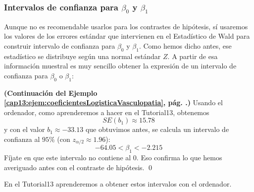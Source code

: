 \subsubsection{Intervalos de confianza para $\beta_0$ y $\beta_1$}

Aunque no es recomendable usarlos para los contrastes de hipótesis, sí usaremos los valores de los errores estándar que intervienen en el Estadístico de Wald para construir intervalo de confianza para $\beta_0$ y $\beta_1$.  Como hemos dicho antes, ese estadístico se distribuye según una normal estándar $Z$. A partir de esa información muestral es muy sencillo obtener la expresión de un intervalo de confianza para $\beta_0$ o $\beta_1$:


\begin{center}
	\end{center}
	
\begin{ejemplo}
\label{cap13:ejem:intConfCoeficientesGlmVasculopatia}
{\bf (Continuación del Ejemplo \ref{cap13:ejem:coeficientesLogisticaVasculopatia}, pág. \pageref{cap13:ejem:coeficientesLogisticaVasculopatia}.)}
Usando el ordenador, como aprenderemos a hacer en el Tutorial13, obtenemos
\[SE(b_1) \approx 15.78 \]
y con el valor $b_1\approx -33.13$ que obtuvimos antes, se calcula un intervalo de confianza al $95\%$ (con $z_{\alpha/2}\approx 1.96$):
\[
-64.05 < \beta_1 <  -2.215
\]	
Fíjate en que este intervalo no contiene al $0$.  Eso confirma lo  que hemos averiguado antes con el contraste de hipótesis.
\qed	
\end{ejemplo}	
	
En el Tutorial13 aprenderemos a obtener estos intervalos con el ordenador.

